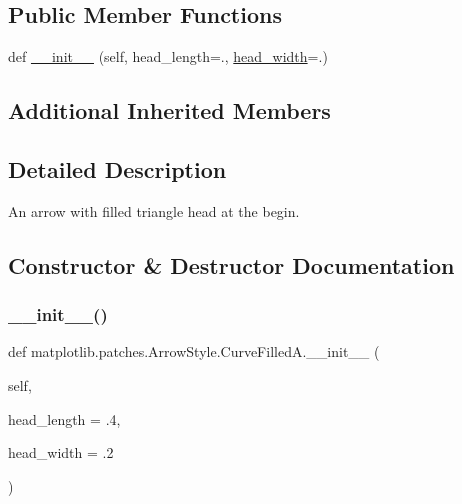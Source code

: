 \subsection*{Public Member Functions}
\begin{DoxyCompactItemize}
\item 
def \hyperlink{classmatplotlib_1_1patches_1_1ArrowStyle_1_1CurveFilledA_af782a9b2d9c478a4847cd3a6f1b2ceff}{\+\_\+\+\_\+init\+\_\+\+\_\+} (self, head\+\_\+length=., \hyperlink{classmatplotlib_1_1patches_1_1ArrowStyle_1_1__Curve_a360e40f4780784399d97fd36b8569ab7}{head\+\_\+width}=.)
\end{DoxyCompactItemize}
\subsection*{Additional Inherited Members}


\subsection{Detailed Description}
\begin{DoxyVerb}An arrow with filled triangle head at the begin.\end{DoxyVerb}
 

\subsection{Constructor \& Destructor Documentation}
\mbox{\label{classmatplotlib_1_1patches_1_1ArrowStyle_1_1CurveFilledA_af782a9b2d9c478a4847cd3a6f1b2ceff}} 
\subsubsection{\texorpdfstring{\+\_\+\+\_\+init\+\_\+\+\_\+()}{\_\_init\_\_()}}
{\footnotesize\ttfamily def matplotlib.\+patches.\+Arrow\+Style.\+Curve\+Filled\+A.\+\_\+\+\_\+init\+\_\+\+\_\+ (\begin{DoxyParamCaption}\item[{}]{self,  }\item[{}]{head\+\_\+length = {\ttfamily .4},  }\item[{}]{head\+\_\+width = {\ttfamily .2} }\end{DoxyParamCaption})}

